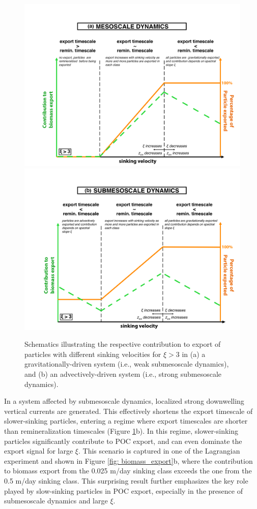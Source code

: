 \documentclass[draft,linenumbers]{agujournal2018}
\begin{document}
 \begin{figure}[ht!]
	\centering
	\includegraphics[width = .65\linewidth]{figures/Fig9_cartoon_meso}\\[.2cm]
	\includegraphics[width = .65\linewidth]{figures/Fig9_cartoon_submeso}
	\caption{Schematics illustrating the respective contribution to export of particles with different sinking velocities for $\xi > 3$ in (a) a gravitationally-driven system (i.e., weak submesoscale dynamics), and (b) an advectively-driven system (i.e., strong submesoscale dynamics).}
	\label{fig: export_cartoon}
\end{figure}

In a system affected by submesoscale dynamics, localized strong downwelling vertical currents are generated. This effectively shortens the export timescale of slower-sinking particles, entering a regime where export timescales are shorter than remineralization timescales (Figure \ref{fig: export_cartoon}b). In this regime, slower-sinking particles significantly contribute to POC export, and can even dominate the export signal for large $\xi$. This scenario is captured in one of the Lagrangian experiment and shown in Figure \ref{fig: biomass_export}b, where the contribution to biomass export from the 0.025 m/day sinking class exceeds the one from the 0.5 m/day sinking class. This surprising result further emphasizes the key role played by slow-sinking particles in POC export, especially in the presence of submesoscale dynamics and large $\xi$.
\end{document}
